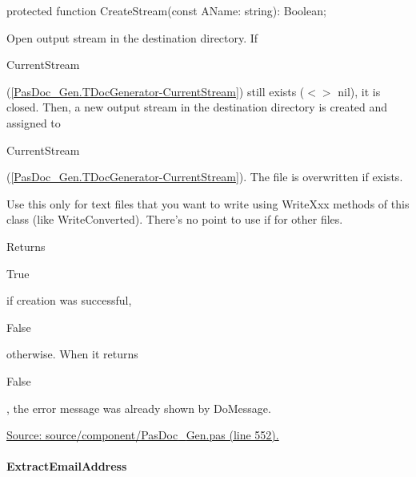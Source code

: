 \documentclass{report}
\newif\ifpdf
\begin{document}
\label{PasDoc_Gen.TDocGenerator-CreateStream}
\begin{list}{}{
\setlength{\itemindent}{0cm}
\setlength{\listparindent}{0cm}
\setlength{\leftmargin}{\evensidemargin}
\addtolength{\leftmargin}{\tmplength}
\settowidth{\labelsep}{X}
\addtolength{\leftmargin}{\labelsep}
\setlength{\labelwidth}{\tmplength}
}
\item[\textbf{Declaration}\hfill]
\ifpdf
\begin{flushleft}
\fi
\begin{ttfamily}
protected function CreateStream(const AName: string): Boolean;\end{ttfamily}

\ifpdf
\end{flushleft}
\fi

\par
\item[\textbf{Description}]
Open output stream in the destination directory. If \begin{ttfamily}CurrentStream\end{ttfamily}(\ref{PasDoc_Gen.TDocGenerator-CurrentStream}) still exists ({$<$}{$>$} nil), it is closed. Then, a new output stream in the destination directory is created and assigned to \begin{ttfamily}CurrentStream\end{ttfamily}(\ref{PasDoc_Gen.TDocGenerator-CurrentStream}). The file is overwritten if exists.

Use this only for text files that you want to write using WriteXxx methods of this class (like WriteConverted). There's no point to use if for other files.

Returns \begin{ttfamily}True\end{ttfamily} if creation was successful, \begin{ttfamily}False\end{ttfamily} otherwise. When it returns \begin{ttfamily}False\end{ttfamily}, the error message was already shown by DoMessage.\par
\href{https://github.com/pasdoc/pasdoc/blob/master/source/component/PasDoc_Gen.pas#L552}{Source: source/component/PasDoc{\_}Gen.pas (line 552).}

\end{list}
\paragraph*{ExtractEmailAddress}\hspace*{\fill}
\end{document}
